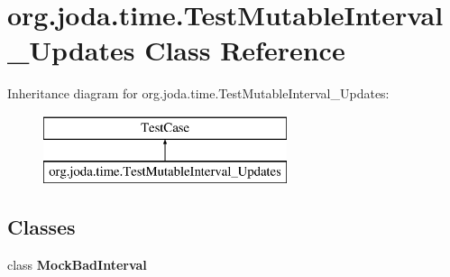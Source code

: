 \hypertarget{classorg_1_1joda_1_1time_1_1_test_mutable_interval___updates}{\section{org.\-joda.\-time.\-Test\-Mutable\-Interval\-\_\-\-Updates Class Reference}
\label{classorg_1_1joda_1_1time_1_1_test_mutable_interval___updates}
}
Inheritance diagram for org.\-joda.\-time.\-Test\-Mutable\-Interval\-\_\-\-Updates\-:\begin{figure}[H]
\begin{center}
\leavevmode
\includegraphics[height=2.000000cm]{classorg_1_1joda_1_1time_1_1_test_mutable_interval___updates}
\end{center}
\end{figure}
\subsection*{Classes}
\begin{DoxyCompactItemize}
\item 
class {\bfseries Mock\-Bad\-Interval}
\end{DoxyCompactItemize}
